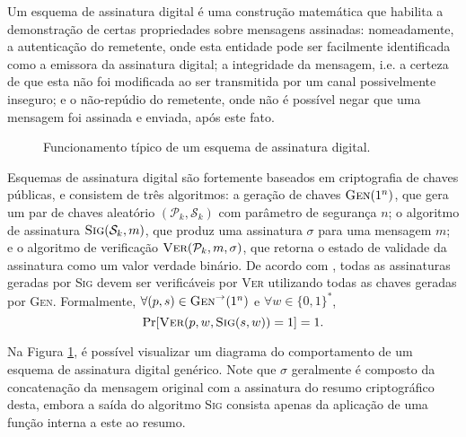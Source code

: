 \documentclass[12pt]{report}
\newcommand{\pk}{$\mathcal{P}_k$}
\newcommand{\sk}{$\mathcal{S}_k$}
\newcommand{\hash}[2][]{\mathcal{H}^{#1}(#2)}
\newcommand{\concat}{\, \vert \vert \,}
\begin{document}
Um esquema de assinatura digital é uma construção matemática que habilita a
demonstração de certas propriedades sobre mensagens assinadas: nomeadamente,
a autenticação do remetente, onde esta entidade pode ser facilmente
identificada como a emissora da assinatura digital; a integridade da mensagem,
i.e. a certeza de que esta não foi modificada ao ser transmitida por um canal
possivelmente inseguro; e o não-repúdio do remetente, onde não é possível negar
que uma mensagem foi assinada e enviada, após este fato.

\begin{figure}[h]
  \centering
  \caption{Funcionamento típico de um esquema de assinatura digital.}
  \label{fig:2}
\end{figure}

Esquemas de assinatura digital são fortemente baseados em criptografia de
chaves públicas, e consistem de três algoritmos: a geração de chaves
$\textsc{Gen}(1^n)$, que gera um par de chaves aleatório $(\mathcal{P}_k,
\mathcal{S}_k)$ com parâmetro de segurança $n$; o algoritmo de assinatura
$\textsc{Sig}(\mathcal{S}_k, m)$, que produz uma assinatura $\sigma$ para uma
mensagem $m$; e o algoritmo de verificação $\textsc{Ver}(\mathcal{P}_k, m,
\sigma)$, que retorna o estado de validade da assinatura como um valor verdade
binário. De acordo com \cite{Goldreich2004}, todas as assinaturas geradas por
\textsc{Sig} devem ser verificáveis por \textsc{Ver} utilizando todas as chaves
geradas por \textsc{Gen}. Formalmente, $\forall (p, s) \in
\textsc{Gen}^{\rightarrow}(1^n)$ e $\forall w \in \{0, 1\}^{*}$,
\begin{equation}
    \text{Pr}[\textsc{Ver}(p, w, \textsc{Sig}(s, w)) = 1] = 1.
\end{equation}

Na Figura \ref{fig:2}, é possível visualizar um diagrama do comportamento de
um esquema de assinatura digital genérico. Note que $\sigma$ geralmente é
composto da concatenação da mensagem original com a assinatura do resumo
criptográfico desta, embora a saída do algoritmo \textsc{Sig} consista apenas
da aplicação de uma função interna a este ao resumo.



\end{document}
